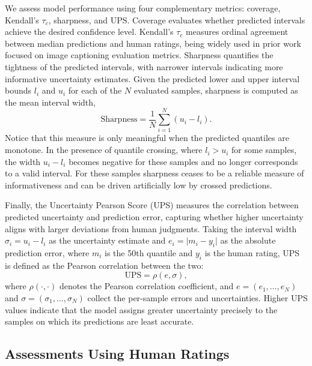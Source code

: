 \documentclass[11pt]{article}
\begin{document}
We assess model performance using four complementary metrics: coverage,
Kendall's $\tau_c$, sharpness, and UPS. Coverage evaluates whether predicted
intervals achieve the desired confidence level. Kendall's $\tau_c$ measures
ordinal agreement between median predictions and human ratings, being widely
used in prior work focused on image captioning evaluation metrics. Sharpness
quantifies the tightness of the predicted intervals, with narrower intervals
indicating more informative uncertainty estimates. Given the predicted lower
and upper interval bounds $l_i$ and $u_i$ for each of the $N$ evaluated
samples, sharpness is computed as the mean interval width,
\begin{equation}
    \mathrm{Sharpness} = \frac{1}{N} \sum_{i=1}^{N} \left( u_i - l_i \right).
\end{equation}
Notice that this measure is only meaningful when the predicted quantiles are monotone. In
the presence of quantile crossing, where $l_i > u_i$ for some samples, the
width $u_i - l_i$ becomes negative for these samples and no longer corresponds to a valid
interval. For these samples sharpness ceases to be a reliable measure of informativeness and can be driven artificially low by crossed predictions. 

Finally,
the Uncertainty Pearson Score (UPS) measures the correlation between predicted
uncertainty and prediction error, capturing whether higher uncertainty aligns
with larger deviations from human judgments. Taking the interval width
$\sigma_i = u_i - l_i$ as the uncertainty estimate and
$e_i = \lvert m_i - y_i \rvert$ as the absolute prediction error, where
$m_i$ is the 50th quantile and $y_i$ is the human rating,
UPS is defined as the Pearson correlation between the two:
\begin{equation}
    \mathrm{UPS} = \rho\left( e, \sigma \right),
\end{equation}
where $\rho(\cdot, \cdot)$ denotes the Pearson correlation coefficient, and
$e = (e_1, \dots, e_N)$ and $\sigma = (\sigma_1, \dots, \sigma_N)$ collect the
per-sample errors and uncertainties. Higher UPS values indicate that the model
assigns greater uncertainty precisely to the samples on which its predictions
are least accurate.

\vspace{-0.13cm}
\subsection{Assessments Using Human Ratings}
\vspace{-0.13cm}
\end{document}
